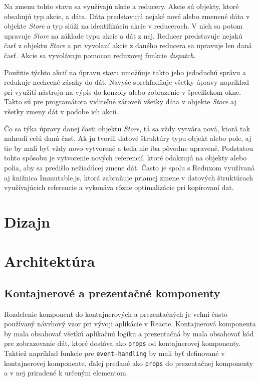 \documentclass[
  digital, %
  table,   %
  lof,     %
  lot,     %
]{fithesis3}
\begin{document}
Na zmenu tohto stavu sa využívajú akcie a reducery. Akcie sú objekty, ktoré obsahujú typ akcie, a dáta. Dáta predstavujú nejaké nové alebo zmenené dáta v objekte \textit{Store} a typ slúži na identifikáciu akcie v reduceroch. V nich sa potom upravuje \textit{Store} na základe typu akcie a dát z nej. Reducer predstavuje nejakú časť z objektu \textit{Store} a pri vyvolaní akcie z daného reducera sa upravuje len daná časť. Akcie sa vyvolávaju pomocou reduxovej funkcie \textit{dispatch}.

Použitie týchto akcií na úpravu stavu umožňuje takto jeho jedoduchú správu a redukuje nechcené zásahy do dát. Navyše sprehľadňuje všetky úpravy napríklad pri využití nástroja na výpis do konzoly alebo zobrazenie v špecifickom okne. Takto sú pre programátora viditeľné zároveň všetky dáta v objekte \textit{Store} aj všetky zmeny dát v podobe ich akcií.

Čo sa týka úpravy danej časti objektu \textit{Store}, tá sa vždy vytvára nová, ktorá tak nahradí celú danú časť. Ak ju tvorili datové štruktúry typu objekt alebo pole, aj tie by mali byť vždy novo vytvorené a teda nie iba pôvodne upravené. Podstatou tohto spôsobu je vytvorenie nových referencií, ktoré odakzujú na objekty alebo polia, aby sa predišlo nežiadúcej zmene dát. Často je spolu s Reduxom využívaná aj knižnica Immutable.js, ktorá zabraňuje priamej zmene v datových štruktúrach využívajúcich referencie a vykonáva rôzne optimalizácie pri kopírovaní dat.

\section{Dizajn}

\section{Architektúra}
\subsection{Kontajnerové a prezentačné komponenty}
Rozdelenie komponent do kontajnerových a prezentačných je veľmi často používaný návrhový vzor pri vývoji aplikácie v Reacte. Kontajnerová komponenta by mala obsahovať všetkú aplikačnú logiku a prezentačná by mala obsahovať kód pre zobrazovanie dát, ktoré dostáva ako \texttt{props} od kontajnerovej komponenty. Taktiež napríklad funkcie pre \texttt{event-handling} by mali byť definované v kontajnerovej komponente, ďalej predané ako \texttt{props} do prezentačnej komponenty a v nej priradené k určeným elementom.
\end{document}
